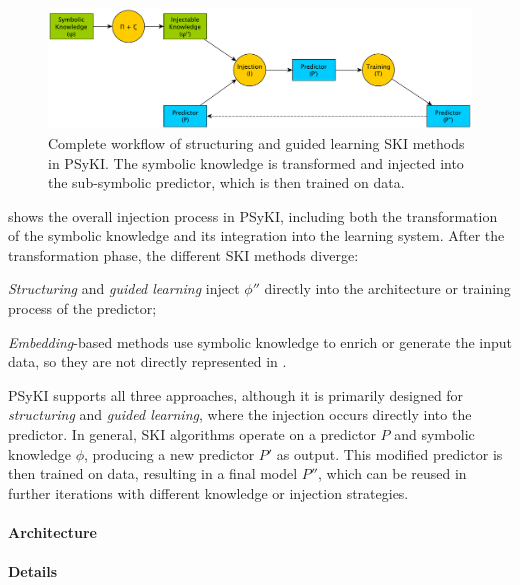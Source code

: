 \begin{figure}
    \centering
    \includegraphics[width=\textwidth]{figures/psyki-workflow}
    \caption[General workflow of PSyKI]{
        Complete workflow of structuring and guided learning \gls{SKI} methods in \Gls{PSyKI}.
        The symbolic knowledge is transformed and injected into the sub-symbolic predictor, which is then trained on data.
    }
    \label{fig:psyki-workflow}
\end{figure}
%
 shows the overall injection process in \gls{PSyKI}, including both the transformation of the symbolic knowledge and its integration into the learning system.
%
After the transformation phase, the different \gls{SKI} methods diverge:
%
\begin{inlinelist}
    \item \emph{Structuring} and \emph{guided learning} inject \(\phi''\) directly into the architecture or training process of the predictor;
    \item \emph{Embedding}-based methods use symbolic knowledge to enrich or generate the input data, so they are not directly represented in .
\end{inlinelist}

\Gls{PSyKI} supports all three approaches, although it is primarily designed for \emph{structuring} and \emph{guided learning}, where the injection occurs directly into the predictor.
%
In general, \gls{SKI} algorithms operate on a predictor \(P\) and symbolic knowledge \(\phi\), producing a new predictor \(P'\) as output.
%
This modified predictor is then trained on data, resulting in a final model \(P''\), which can be reused in further iterations with different knowledge or injection strategies.


\paragraph{Architecture}\label{par:architecture}

\paragraph{Details}\label{par:details}


